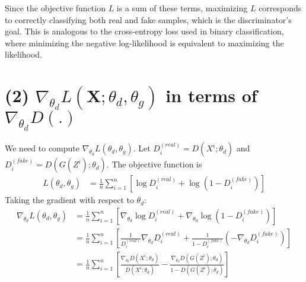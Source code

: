 \documentclass[11pt, a4paper, oneside]{memoir}
\begin{document}
Since the objective function $L$ is a sum of these terms, maximizing $L$ corresponds to correctly classifying both real and fake samples,
which is the discriminator's goal. This is analogous to the cross-entropy loss used in binary classification,
where minimizing the negative log-likelihood is equivalent to maximizing the likelihood.
 
\section*{(2) $\nabla_{\theta_d} L(\boldsymbol{X}; \theta_d, \theta_g)$ in terms of $\nabla_{\theta_d}D(.)$}
We need to compute $\nabla_{\theta_d} L (\theta_d, \theta_g)$.
Let $D_i^{(real)} = D(X^i; \theta_d)$ and $D_i^{(fake)} = D(G(Z^i); \theta_d)$.
The objective function is
\begin{align*}
L (\theta_d, \theta_g) &= \frac{1}{n}\sum_{i=1}^{n} \left[ \log D_i^{(real)} + \log (1 - D_i^{(fake)}) \right]
\end{align*}
Taking the gradient with respect to $\theta_d$:
\begin{align*}
\nabla_{\theta_d} L (\theta_d, \theta_g) &= \frac{1}{n}\sum_{i=1}^{n} \left[ \nabla_{\theta_d} \log D_i^{(real)} + \nabla_{\theta_d} \log (1 - D_i^{(fake)}) \right] \\
&= \frac{1}{n}\sum_{i=1}^{n} \left[ \frac{1}{D_i^{(real)}} \nabla_{\theta_d} D_i^{(real)} + \frac{1}{1 - D_i^{(fake)}} \left( - \nabla_{\theta_d} D_i^{(fake)} \right) \right] \\
&= \frac{1}{n}\sum_{i=1}^{n} \left[ \frac{\nabla_{\theta_d} D(X^i; \theta_d)}{D(X^i; \theta_d)} - \frac{\nabla_{\theta_d} D(G(Z^i); \theta_d)}{1 - D(G(Z^i); \theta_d)} \right]
\end{align*}
\end{document}
